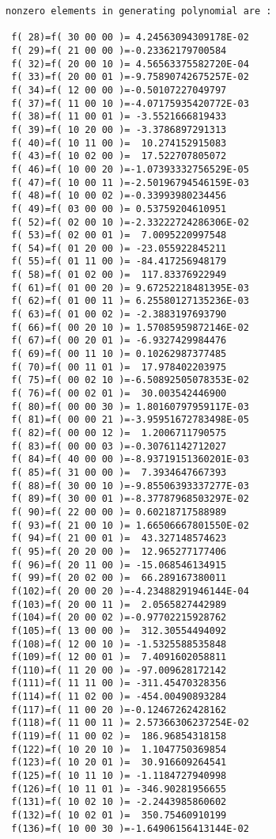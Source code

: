 \begin{footnotesize}
\begin{verbatim}
nonzero elements in generating polynomial are :

 f( 28)=f( 30 00 00 )= 4.24563094309178E-02
 f( 29)=f( 21 00 00 )=-0.23362179700584
 f( 32)=f( 20 00 10 )= 4.56563375582720E-04
 f( 33)=f( 20 00 01 )=-9.75890742675257E-02
 f( 34)=f( 12 00 00 )=-0.50107227049797
 f( 37)=f( 11 00 10 )=-4.07175935420772E-03
 f( 38)=f( 11 00 01 )= -3.5521666819433
 f( 39)=f( 10 20 00 )= -3.3786897291313
 f( 40)=f( 10 11 00 )=  10.274152915083
 f( 43)=f( 10 02 00 )=  17.522707805072
 f( 46)=f( 10 00 20 )=-1.07393332756529E-05
 f( 47)=f( 10 00 11 )=-2.50196794546159E-03
 f( 48)=f( 10 00 02 )=-0.33993980234456
 f( 49)=f( 03 00 00 )= 0.53759204610951
 f( 52)=f( 02 00 10 )=-2.33222724286306E-02
 f( 53)=f( 02 00 01 )=  7.0095220997548
 f( 54)=f( 01 20 00 )= -23.055922845211
 f( 55)=f( 01 11 00 )= -84.417256948179
 f( 58)=f( 01 02 00 )=  117.83376922949
 f( 61)=f( 01 00 20 )= 9.67252218481395E-03
 f( 62)=f( 01 00 11 )= 6.25580127135236E-03
 f( 63)=f( 01 00 02 )= -2.3883197693790
 f( 66)=f( 00 20 10 )= 1.57085959872146E-02
 f( 67)=f( 00 20 01 )= -6.9327429984476
 f( 69)=f( 00 11 10 )= 0.10262987377485
 f( 70)=f( 00 11 01 )=  17.978402203975
 f( 75)=f( 00 02 10 )=-6.50892505078353E-02
 f( 76)=f( 00 02 01 )=  30.003542446900
 f( 80)=f( 00 00 30 )= 1.80160797959117E-03
 f( 81)=f( 00 00 21 )=-3.95951672783498E-05
 f( 82)=f( 00 00 12 )=  1.2006711790575
 f( 83)=f( 00 00 03 )=-0.30761142712027
 f( 84)=f( 40 00 00 )=-8.93719151360201E-03
 f( 85)=f( 31 00 00 )=  7.3934647667393
 f( 88)=f( 30 00 10 )=-9.85506393337277E-03
 f( 89)=f( 30 00 01 )=-8.37787968503297E-02
 f( 90)=f( 22 00 00 )= 0.60218717588989
 f( 93)=f( 21 00 10 )= 1.66506667801550E-02
 f( 94)=f( 21 00 01 )=  43.327148574623
 f( 95)=f( 20 20 00 )=  12.965277177406
 f( 96)=f( 20 11 00 )= -15.068546134915
 f( 99)=f( 20 02 00 )=  66.289167380011
 f(102)=f( 20 00 20 )=-4.23488291946144E-04
 f(103)=f( 20 00 11 )=  2.0565827442989
 f(104)=f( 20 00 02 )=-0.97702215928762
 f(105)=f( 13 00 00 )=  312.30554494092
 f(108)=f( 12 00 10 )= -1.5325588535848
 f(109)=f( 12 00 01 )=  7.4091602058811
 f(110)=f( 11 20 00 )= -97.009628172142
 f(111)=f( 11 11 00 )= -311.45470328356
 f(114)=f( 11 02 00 )= -454.00490893284
 f(117)=f( 11 00 20 )=-0.12467262428162
 f(118)=f( 11 00 11 )= 2.57366306237254E-02
 f(119)=f( 11 00 02 )=  186.96854318158
 f(122)=f( 10 20 10 )=  1.1047750369854
 f(123)=f( 10 20 01 )=  30.916609264541
 f(125)=f( 10 11 10 )= -1.1184727940998
 f(126)=f( 10 11 01 )= -346.90281956655
 f(131)=f( 10 02 10 )= -2.2443985860602
 f(132)=f( 10 02 01 )=  350.75460910199
 f(136)=f( 10 00 30 )=-1.64906156413144E-02

\end{verbatim}
\end{footnotesize}
